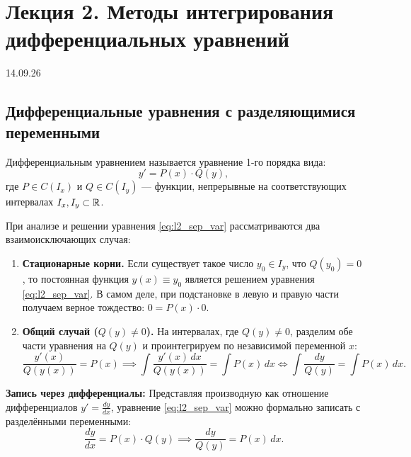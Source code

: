 \section{Лекция 2. Методы интегрирования дифференциальных уравнений}

\begin{flushright}
    14.09.26
\end{flushright}

\subsection{Дифференциальные уравнения с разделяющимися переменными}

\begin{definition}
    Дифференциальным уравнением 
    называется уравнение 1-го порядка вида:
    \begin{equation} \label{eq:l2_sep_var}
        y' = P(x) \cdot Q(y), \tag{1}
    \end{equation}
    где $P \in C(I_x)$ и $Q \in C(I_y)$ — функции, непрерывные на
    соответствующих интервалах $I_x, I_y \subset \mathbb{R}$.
\end{definition}

При анализе и решении уравнения \eqref{eq:l2_sep_var} рассматриваются два
взаимоисключающих случая:
\begin{enumerate}
    \item \textbf{Стационарные корни.} Если существует такое число
    $y_0 \in I_y$, что $Q(y_0) = 0$, то постоянная функция $y(x) \equiv y_0$
    является решением уравнения \eqref{eq:l2_sep_var}. В самом деле, при
    подстановке в левую и правую части получаем верное тождество:
    $0 = P(x) \cdot 0$.
    \item \textbf{Общий случай ($Q(y) \neq 0$).} На интервалах, где
    $Q(y) \neq 0$, разделим обе части уравнения на $Q(y)$ и проинтегрируем по
    независимой переменной $x$:
    \[
        \frac{y'(x)}{Q(y(x))} = P(x) \implies
        \int \frac{y'(x) \, dx}{Q(y(x))} = \int P(x) \, dx
        \iff \int \frac{dy}{Q(y)} = \int P(x) \, dx.
    \]
\end{enumerate}

\textbf{Запись через дифференциалы:}
Представляя производную как отношение дифференциалов $y' = \frac{dy}{dx}$,
уравнение \eqref{eq:l2_sep_var} можно формально записать с разделёнными
переменными:
\begin{equation} \label{eq:l2_sep_diff}
    \frac{dy}{dx} = P(x) \cdot Q(y) \implies \frac{dy}{Q(y)} = P(x) \, dx.
    \tag{2}
\end{equation}

